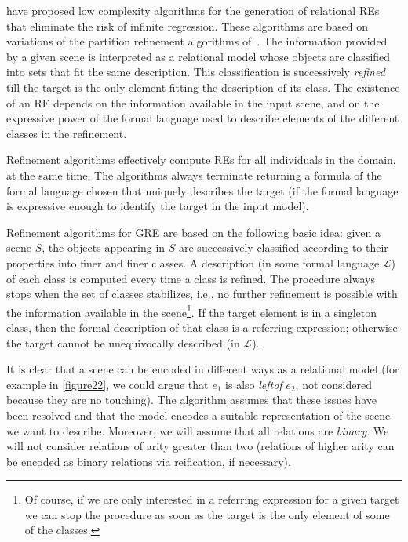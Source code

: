 \cite{arec2:2008:Areces,arec:usin11} have proposed low complexity
algorithms for the generation of relational REs
that eliminate the risk of infinite regression.  These algorithms are
based on variations of the partition refinement algorithms
of~\cite{paig:thre87}.  The information provided by a given scene
is interpreted as a relational model whose objects are classified into
sets that fit the same description.  This classification is
successively \emph{refined} till the target is the only element
fitting the description of its class.  The existence of an RE depends
on the information available in the input scene, and on the expressive
power of the formal language used to describe elements of the
different classes in the refinement.

Refinement
algorithms %
effectively compute REs for all individuals in the domain, at the same
time. The algorithms always terminate returning a formula of the
formal language chosen that uniquely describes the target (if the
formal language is expressive enough to identify the target in the
input model).


Refinement algorithms for GRE are based on the following basic idea:
given a scene $S$, the objects appearing in $S$ are successively
classified according to their properties into finer and finer
classes. A description (in some formal language $\mathcal{L}$) of each
class is computed every time a class is refined. The procedure always
stops when the set of classes stabilizes, i.e., no further refinement
is possible with the information available in the scene\footnote{Of
  course, if we are only interested in a referring expression for a
  given target we can stop the procedure as soon as the target is the
  only element of some of the classes.}.  If the target element is in
a singleton class, then the formal description of that class is a
referring expression; otherwise the target cannot be unequivocally
described (in $\mathcal{L}$).

It is clear that a scene can be encoded in different ways as a
relational model (for example in \ref{figure22}, we could argue that
$e_1$ is also \emph{leftof} $e_2$, not considered because they are no
touching). The algorithm assumes that these issues have been resolved
and that the model encodes a suitable representation of the scene we
want to describe.  Moreover, we will assume that all relations are
\emph{binary}.  We will not consider relations of arity greater than
two (relations of higher arity can be encoded as binary relations via
reification, if necessary).

